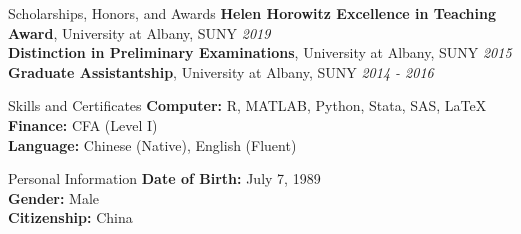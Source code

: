 \documentclass{resume_liang} %
\begin{document}
\begin{rSection}{Scholarships, Honors, and Awards} 
{\bf Helen Horowitz Excellence in Teaching Award}{, University at Albany, SUNY} \hfill{\em 2019}  \\ 
{\bf Distinction in Preliminary Examinations}{, University at Albany, SUNY} \hfill{\em 2015}  \\
{\bf Graduate Assistantship}{, University at Albany, SUNY} \hfill{\em 2014 - 2016}  \\
\end{rSection}
\bigskip \bigskip





\begin{rSection}{Skills and Certificates}
{\bf Computer:} R, MATLAB, Python, Stata, SAS, LaTeX
\\
{\bf Finance:} CFA (Level I)
\\
{\bf Language:} Chinese (Native), English (Fluent) 
\end{rSection}
\bigskip \bigskip









\begin{rSection}{Personal Information }
{\bf Date of Birth:} July 7, 1989  \\
{\bf Gender:} Male  \\
{\bf Citizenship:} China
\\
\end{rSection}
\end{document}
